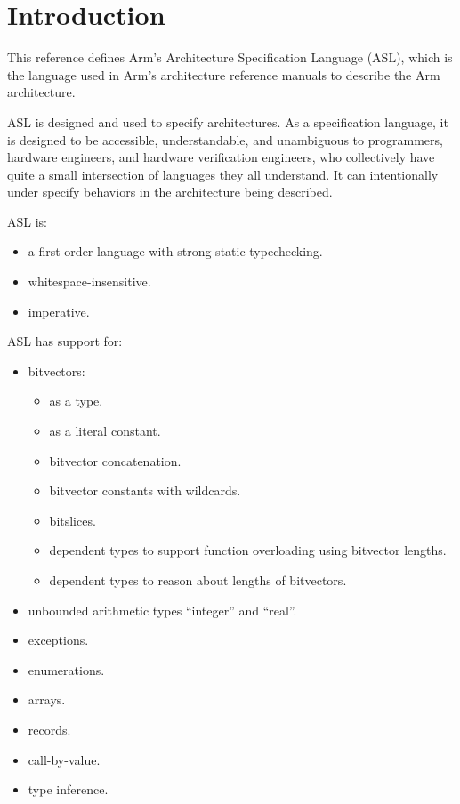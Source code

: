 \chapter{Introduction\label{chap:Introduction}}

This reference defines Arm’s Architecture Specification Language (ASL), which is the language
used in Arm’s architecture reference manuals to describe the Arm architecture.

ASL is designed and used to specify architectures. As a specification language, it is designed to be accessible,
understandable, and unambiguous to programmers, hardware
engineers, and hardware verification engineers, who collectively have quite a small intersection of languages they
all understand. It can intentionally under specify behaviors in the architecture being described.

ASL is:
\begin{itemize}
    \item a first-order language with strong static typechecking.
    \item whitespace-insensitive.
    \item imperative.
\end{itemize}

ASL has support for:
\begin{itemize}
    \item bitvectors:
    \begin{itemize}
        \item as a type.
        \item as a literal constant.
        \item bitvector concatenation.
        \item bitvector constants with wildcards.
        \item bitslices.
        \item dependent types to support function overloading using bitvector lengths.
        \item dependent types to reason about lengths of bitvectors.
    \end{itemize}
    \item unbounded arithmetic types “integer” and “real”.
    \item exceptions.
    \item enumerations.
    \item arrays.
    \item records.
    \item call-by-value.
    \item type inference.
\end{itemize}

